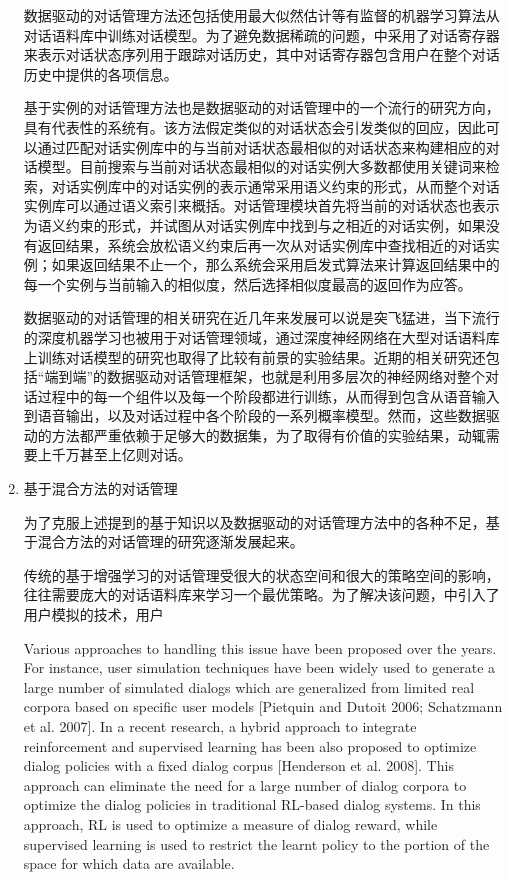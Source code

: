 \begin{enumerate}
数据驱动的对话管理方法还包括使用最大似然估计等有监督的机器学习算法从对话语料库中训练对话模型\cite{Hurtado2005}。为了避免数据稀疏的问题，\cite{Hurtado2005}中采用了对话寄存器来表示对话状态序列用于跟踪对话历史，其中对话寄存器包含用户在整个对话历史中提供的各项信息。

基于实例的对话管理方法也是数据驱动的对话管理中的一个流行的研究方向，具有代表性的系统有\cite{Murao2003, Inui2001, Lee2009c}。该方法假定类似的对话状态会引发类似的回应，因此可以通过匹配对话实例库中的与当前对话状态最相似的对话状态来构建相应的对话模型。目前搜索与当前对话状态最相似的对话实例大多数都使用关键词来检索，对话实例库中的对话实例的表示通常采用语义约束的形式，从而整个对话实例库可以通过语义索引来概括\cite{Lee2009c}。对话管理模块首先将当前的对话状态也表示为语义约束的形式，并试图从对话实例库中找到与之相近的对话实例，如果没有返回结果，系统会放松语义约束后再一次从对话实例库中查找相近的对话实例；如果返回结果不止一个，那么系统会采用启发式算法来计算返回结果中的每一个实例与当前输入的相似度，然后选择相似度最高的返回作为应答。

数据驱动的对话管理的相关研究在近几年来发展可以说是突飞猛进，当下流行的深度机器学习也被用于对话管理领域，通过深度神经网络在大型对话语料库上训练对话模型的研究也取得了比较有前景的实验结果\cite{Shang2015, Sordoni2015b, VinyalsLe2015}。近期的相关研究还包括“端到端”的数据驱动对话管理框架，也就是利用多层次的神经网络对整个对话过程中的每一个组件以及每一个阶段都进行训练，从而得到包含从语音输入到语音输出，以及对话过程中各个阶段的一系列概率模型\cite{Serban2015}。然而，这些数据驱动的方法都严重依赖于足够大的数据集，为了取得有价值的实验结果，动辄需要上千万甚至上亿则对话。

\item 基于混合方法的对话管理

为了克服上述提到的基于知识以及数据驱动的对话管理方法中的各种不足，基于混合方法的对话管理的研究逐渐发展起来。

传统的基于增强学习的对话管理受很大的状态空间和很大的策略空间的影响，往往需要庞大的对话语料库来学习一个最优策略。为了解决该问题，\cite{Pietquin2006, Schatzmann2007}中引入了用户模拟的技术，用户

  Various approaches to handling this issue have been proposed over the years.  For instance, user simulation techniques have been widely used to generate
a large number of simulated dialogs which are generalized from limited real corpora
based on specific user models [Pietquin and Dutoit 2006; Schatzmann et al. 2007]. In
a recent research, a hybrid approach to integrate reinforcement and supervised
learning has been also proposed to optimize dialog policies with a fixed dialog corpus
[Henderson et al. 2008]. This approach can eliminate the need for a large number of
dialog corpora to optimize the dialog policies in traditional RL-based dialog systems.
In this approach, RL is used to optimize a measure of dialog reward, while supervised
learning is used to restrict the learnt policy to the portion of the space for which data
are available.


\end{enumerate}

